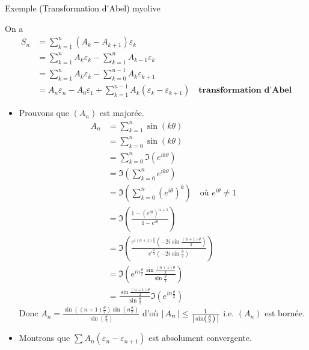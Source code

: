 \begin{omed}{Exemple \textcolor{black}{(Transformation d’Abel)} }{myolive}
\begin{itemize}
            On a \begin{align*}
                S_n 
                &= \sum_{k=1}^n \left(A_k - A_{k+1}\right) \varepsilon_k \\
                &= \sum_{k=1}^n A_k \varepsilon_k - \sum_{k=1}^n A_{k-1} \varepsilon_k \\
                &= \sum_{k=1}^n A_k \varepsilon_k - \sum_{k=0}^{n-1} A_k \varepsilon_{k+1} \\
                &= A_n \varepsilon_n - A_0 \varepsilon_1 + \sum_{k=1}^{n-1} A_k \left(\varepsilon_k - \varepsilon_{k+1}\right)  \quad \textbf{transformation d’Abel}
            \end{align*}
            \begin{itemize}
                \item Prouvons que $(A_n)$ est majorée. 
                \begin{align*}
                    A_n 
                    &= \sum_{k=1}^n \sin(k \theta) \\
                    &= \sum_{k=0}^{n} \sin(k \theta) \\
                    &= \sum_{k=0}^{n} \Im(e^{i k \theta}) \\
                    &= \Im \left(\sum_{k=0}^{n} e^{i k \theta}\right) \\
                    &= \Im \left(\sum_{k=0}^{n} \left(e^{i \theta}\right)^k \right) \quad \text{où } e^{i \theta} \neq 1 \\
                    &= \Im \left( \frac{1 - (e^{i\theta})^{n+1}}{1 - e^{i\theta}} \right) \\
                    &= \Im \left( \frac{e^{i (n+1) \frac{\theta}{2}} \left(-2i \sin \frac{(n+1)\theta}{2}\right)}{e^{i \frac{\theta}{2}} (-2i \sin \frac{\theta}{2})} \right) \\
                    &= \Im \left(e^{i n \frac{\theta}{2}} \frac{\sin \frac{(n+1) \theta}{2}}{\sin \frac{\theta}{2}}\right) \\
                    &= \frac{\sin \frac{(n+1) \theta}{2}}{\sin \frac{\theta}{2}} \Im \left(e^{i n \frac{\theta}{2}}\right)
                \end{align*}
                Donc $ A_n = \frac{\sin\left((n+1)\frac{\theta}{2}\right) \sin\left(n \frac{\theta}{2}\right)}{\sin\left(\frac{\theta}{2}\right)}$ d’où $\left\lvert \,A_n \, \right\rvert \leq \frac{1}{\left\lvert \,\sin\left(\frac{\theta}{2}\right) \, \right\rvert}$ i.e. $(A_n)$ est bornée.
                \item Montrons que $\sum A_n \left(\varepsilon_n - \varepsilon_{n+1}\right)$ est absolument convergente. 
                

\end{itemize}
\end{itemize}
\end{omed}
